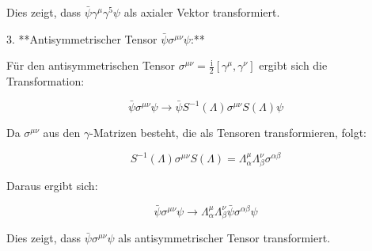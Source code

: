 Dies zeigt, dass \(\bar{\psi} \gamma^\mu \gamma^5 \psi\) als axialer Vektor transformiert.

3. **Antisymmetrischer Tensor \(\bar{\psi} \sigma^{\mu \nu} \psi\):**

Für den antisymmetrischen Tensor \(\sigma^{\mu \nu} = \frac{\mathrm{i}}{2} [\gamma^\mu, \gamma^\nu]\) ergibt sich die Transformation:

\[
\bar{\psi} \sigma^{\mu \nu} \psi \rightarrow \bar{\psi} S^{-1}(\Lambda) \sigma^{\mu \nu} S(\Lambda) \psi
\]

Da \(\sigma^{\mu \nu}\) aus den \(\gamma\)-Matrizen besteht, die als Tensoren transformieren, folgt:

\[
S^{-1}(\Lambda) \sigma^{\mu \nu} S(\Lambda) = \Lambda_\alpha^\mu \Lambda_\beta^\nu \sigma^{\alpha \beta}
\]

Daraus ergibt sich:

\[
\bar{\psi} \sigma^{\mu \nu} \psi \rightarrow \Lambda_\alpha^\mu \Lambda_\beta^\nu \bar{\psi} \sigma^{\alpha \beta} \psi
\]

Dies zeigt, dass \(\bar{\psi} \sigma^{\mu \nu} \psi\) als antisymmetrischer Tensor transformiert.

